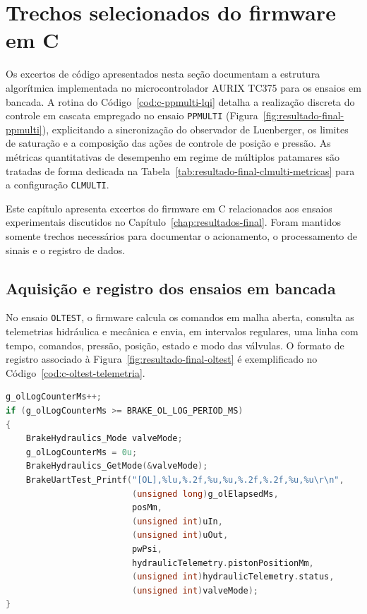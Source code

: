 \chapter{Trechos selecionados do firmware em C}
\label{ap:codigo-c-firmware}

Os excertos de código apresentados nesta seção documentam a estrutura algorítmica implementada no microcontrolador AURIX TC375 para os ensaios em bancada. A rotina do Código~\ref{cod:c-ppmulti-lqi} detalha a realização discreta do controle em cascata empregado no ensaio \texttt{PPMULTI} (Figura~\ref{fig:resultado-final-ppmulti}), explicitando a sincronização do observador de Luenberger, os limites de saturação e a composição das ações de controle de posição e pressão. As métricas quantitativas de desempenho em regime de múltiplos patamares são tratadas de forma dedicada na Tabela~\ref{tab:resultado-final-clmulti-metricas} para a configuração \texttt{CLMULTI}.

Este capítulo apresenta excertos do firmware em C relacionados aos ensaios experimentais discutidos no Capítulo~\ref{chap:resultados-final}. Foram mantidos somente trechos necessários para documentar o acionamento, o processamento de sinais e o registro de dados.

\section{Aquisição e registro dos ensaios em bancada}
\label{ap:codigo-c-aquisicao}

No ensaio \texttt{OLTEST}, o firmware calcula os comandos em malha aberta, consulta as telemetrias hidráulica e mecânica e envia, em intervalos regulares, uma linha com tempo, comandos, pressão, posição, estado e modo das válvulas. O formato de registro associado à Figura~\ref{fig:resultado-final-oltest} é exemplificado no Código~\ref{cod:c-oltest-telemetria}.

\begin{lstlisting}[language=C,caption={Registro serial de telemetria do ensaio OLTEST.},label={cod:c-oltest-telemetria}]
g_olLogCounterMs++;
if (g_olLogCounterMs >= BRAKE_OL_LOG_PERIOD_MS)
{
    BrakeHydraulics_Mode valveMode;
    g_olLogCounterMs = 0u;
    BrakeHydraulics_GetMode(&valveMode);
    BrakeUartTest_Printf("[OL],%lu,%.2f,%u,%u,%.2f,%.2f,%u,%u\r\n",
                         (unsigned long)g_olElapsedMs,
                         posMm,
                         (unsigned int)uIn,
                         (unsigned int)uOut,
                         pwPsi,
                         hydraulicTelemetry.pistonPositionMm,
                         (unsigned int)hydraulicTelemetry.status,
                         (unsigned int)valveMode);
}
\end{lstlisting}

